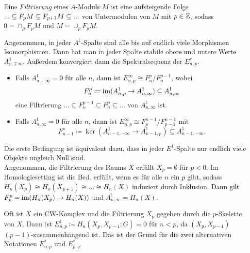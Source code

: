 \documentclass{cheat-sheet}
\newcommand{\nacong}{\!\cong\!} %
\begin{document}
\begin{defn}
  Eine \emph{Filtrierung} eines $A$-Moduls $M$ ist eine aufsteigende Folge $... \subseteq F_p M \subseteq F_{p+1} M \subseteq ...$ von Untermodulen von $M$ mit $p \in \mathbb{Z}$, sodass $0 = \cap_p F_p M$ und $M = \cup_p F_p M$.
\end{defn}

\begin{prop}
  Angenommen, in jeder $A^1$-Spalte sind alle bis auf endlich viele Morphismen Isomorphismen. Dann hat man in jeder Spalte stabile obere und untere Werte $A^1_{n, \mp \infty}$. Außerdem konvergiert dann die Spektralsequenz der $E^r_{n,p}$.
  \begin{itemize}
    \item Falls $A^1_{n,-\infty} = 0$ für alle $n$, dann ist $E^\infty_{n,p} \cong F^p_n / F^{p-1}_n$, wobei
    \[ F^p_n \coloneqq \operatorname{im}(A^1_{n,p} \to A^1_{n,\infty}) \subseteq A^1_{n,\infty} \]
    eine Filtrierung $\ldots \subseteq F^{p-1}_n \subseteq F^p_n \subseteq \ldots$ von $A^1_{n,\infty}$ ist.
    \item Falls $A^1_{n,\infty} = 0$ für alle $n$, dann ist $E^\infty_{n,p} \cong F^{n-1}_p / F^{n-1}_{p-1}$ mit
    \[ F^p_{n-1} \coloneqq \ker(A^1_{n-1,-\infty} \to A^1_{n-1,p}) \subseteq A^1_{n-1,-\infty}. \]
  \end{itemize}
\end{prop}

\begin{bem}
  Die erste Bedingung ist äquivalent dazu, dass in jeder $E^1$-Spalte nur endlich viele Objekte ungleich Null sind. \\
  Angenommen, die Filtrierung des Raums $X$ erfüllt $X_p = \emptyset$ für $p < 0$.
  Im Homologiesetting ist die Bed. erfüllt, wenn es für alle $n$ ein $p$ gibt, sodass $H_n(X_p) \nacong H_n(X_{p+1}) \nacong \ldots \nacong H_n(X)$ induziert durch Inklusion.
  Dann gilt $F^p_n = \operatorname{im}(H_n(X_p) \to H_n(X))$ und $A^1_{n,\infty} = H_n(X)$. \\
\end{bem}

\begin{bem}
  Oft ist $X$ ein CW-Komplex und die Filtrierung $X_p$ gegeben durch die $p$-Skelette von $X$. Dann ist $E^1_{n,p} \coloneqq H_n(X_p, X_{p-1}; G) = 0$ für $n < p$, da $(X_p, X_{p-1})$ $(p\!-\!1)$-zusammenhängend ist. Das ist der Grund für die zwei alternativen Notationen $E^*_{n,p}$ und $E^*_{p,q}$.
\end{bem}
\end{document}
